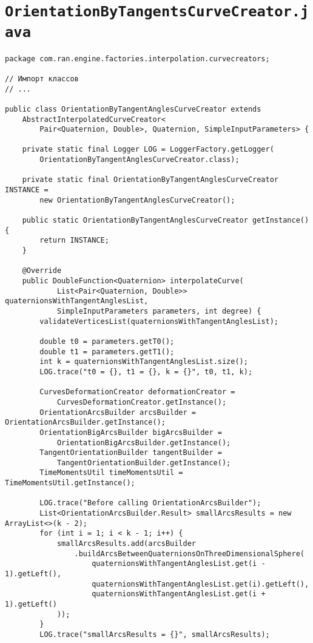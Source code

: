 \section*{\texttt{OrientationByTangentsCurveCreator.java}}
\begin{verbatim}
package com.ran.engine.factories.interpolation.curvecreators;

// Импорт классов
// ...

public class OrientationByTangentAnglesCurveCreator extends
    AbstractInterpolatedCurveCreator<
        Pair<Quaternion, Double>, Quaternion, SimpleInputParameters> {

    private static final Logger LOG = LoggerFactory.getLogger(
        OrientationByTangentAnglesCurveCreator.class);

    private static final OrientationByTangentAnglesCurveCreator INSTANCE =
        new OrientationByTangentAnglesCurveCreator();

    public static OrientationByTangentAnglesCurveCreator getInstance() {
        return INSTANCE;
    }

    @Override
    public DoubleFunction<Quaternion> interpolateCurve(
            List<Pair<Quaternion, Double>> quaternionsWithTangentAnglesList,
            SimpleInputParameters parameters, int degree) {
        validateVerticesList(quaternionsWithTangentAnglesList);

        double t0 = parameters.getT0();
        double t1 = parameters.getT1();
        int k = quaternionsWithTangentAnglesList.size();
        LOG.trace("t0 = {}, t1 = {}, k = {}", t0, t1, k);

        CurvesDeformationCreator deformationCreator =
            CurvesDeformationCreator.getInstance();
        OrientationArcsBuilder arcsBuilder = OrientationArcsBuilder.getInstance();
        OrientationBigArcsBuilder bigArcsBuilder =
            OrientationBigArcsBuilder.getInstance();
        TangentOrientationBuilder tangentBuilder =
            TangentOrientationBuilder.getInstance();
        TimeMomentsUtil timeMomentsUtil = TimeMomentsUtil.getInstance();

        LOG.trace("Before calling OrientationArcsBuilder");
        List<OrientationArcsBuilder.Result> smallArcsResults = new ArrayList<>(k - 2);
        for (int i = 1; i < k - 1; i++) {
            smallArcsResults.add(arcsBuilder
                .buildArcsBetweenQuaternionsOnThreeDimensionalSphere(
                    quaternionsWithTangentAnglesList.get(i - 1).getLeft(),
                    quaternionsWithTangentAnglesList.get(i).getLeft(),
                    quaternionsWithTangentAnglesList.get(i + 1).getLeft()
            ));
        }
        LOG.trace("smallArcsResults = {}", smallArcsResults);


\end{verbatim}
